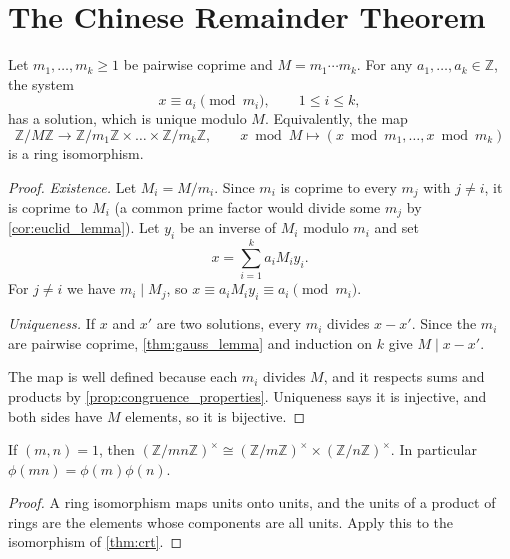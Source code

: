 \section{The Chinese Remainder Theorem}

\begin{theorem}\label{thm:crt}
    Let $m_1, \dots, m_k \ge 1$ be pairwise coprime and $M = m_1 \cdots m_k$. For any $a_1, \dots, a_k \in \mathbb{Z}$, the system
    \begin{equation*}
        x \equiv a_i \pmod{m_i}, \qquad 1 \le i \le k,
    \end{equation*}
    has a solution, which is unique modulo $M$. Equivalently, the map
    \begin{equation*}
        \mathbb{Z}/M\mathbb{Z} \to \mathbb{Z}/m_1\mathbb{Z} \times \dots \times \mathbb{Z}/m_k\mathbb{Z}, \qquad x \bmod M \mapsto (x \bmod m_1, \dots, x \bmod m_k)
    \end{equation*}
    is a ring isomorphism.
\end{theorem}
\begin{proof}
    \emph{Existence.} Let $M_i = M/m_i$. Since $m_i$ is coprime to every $m_j$ with $j \neq i$, it is coprime to $M_i$ (a common prime factor would divide some $m_j$ by \cref{cor:euclid_lemma}). Let $y_i$ be an inverse of $M_i$ modulo $m_i$ and set
    \begin{equation*}
        x = \sum_{i=1}^{k} a_i M_i y_i.
    \end{equation*}
    For $j \neq i$ we have $m_i \mid M_j$, so $x \equiv a_i M_i y_i \equiv a_i \pmod{m_i}$.

    \emph{Uniqueness.} If $x$ and $x'$ are two solutions, every $m_i$ divides $x - x'$. Since the $m_i$ are pairwise coprime, \cref{thm:gauss_lemma} and induction on $k$ give $M \mid x - x'$.

    The map is well defined because each $m_i$ divides $M$, and it respects sums and products by \cref{prop:congruence_properties}. Uniqueness says it is injective, and both sides have $M$ elements, so it is bijective.
\end{proof}

\begin{corollary}\label{cor:phi_multiplicative}
    If $(m,n) = 1$, then $(\mathbb{Z}/mn\mathbb{Z})^\times \cong (\mathbb{Z}/m\mathbb{Z})^\times \times (\mathbb{Z}/n\mathbb{Z})^\times$. In particular $\phi(mn) = \phi(m)\phi(n)$.
\end{corollary}
\begin{proof}
    A ring isomorphism maps units onto units, and the units of a product of rings are the elements whose components are all units. Apply this to the isomorphism of \cref{thm:crt}.
\end{proof}

